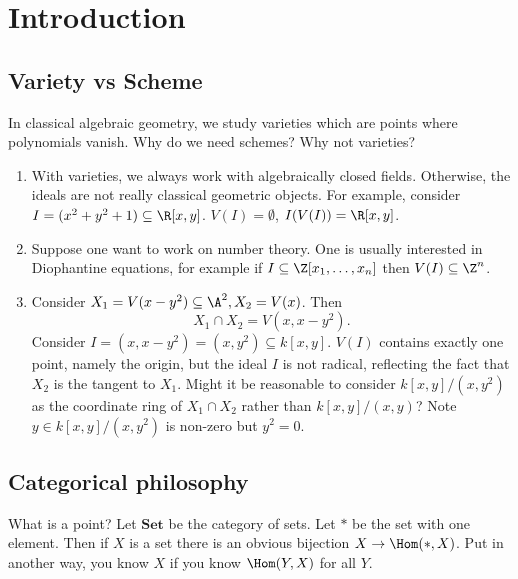 \documentclass[a4paper]{article}
\renewcommand{\c}[1]{\mathbf{#1}} %
\begin{document}


\tableofcontents

\setcounter{section}{-1}

\section{Introduction}

\subsection{Variety vs Scheme}

In classical algebraic geometry, we study varieties which are points where polynomials vanish. Why do we need schemes? Why not varieties?
\begin{enumerate}
\item With varieties, we always work with algebraically closed fields. Otherwise, the ideals are not really classical geometric objects. For example, consider \(I = (x^2 + y^2 + 1) \subseteq \R[x, y]\). \(V(I) = \emptyset\), \(I(V(I)) = \R[x, y]\).
\item Suppose one want to work on number theory. One is usually interested in Diophantine equations, for example if \(I \subseteq \Z[x_1, \dots, x_n]\) then \(V(I) \subseteq \Z^n\). 
\item Consider \(X_1 = V(x - y^2) \subseteq \A^2, X_2 = V(x)\). Then
  \[
    X_1 \cap X_2 = V(x, x - y^2).
  \]
  Consider \(I = (x, x - y^2) = (x, y^2) \subseteq k[x, y]\). \(V(I)\) contains exactly one point, namely the origin, but the ideal \(I\) is not radical, reflecting the fact that \(X_2\) is the tangent to \(X_1\). Might it be reasonable to consider \(k[x, y]/(x, y^2)\) as the coordinate ring of \(X_1 \cap X_2\) rather than \(k[x, y]/(x, y)\)? Note \(y \in k[x, y]/(x, y^2)\) is non-zero but \(y^2 = 0\).
\end{enumerate}

\subsection{Categorical philosophy}

What is a point? Let \(\c{Set}\) be the category of sets. Let \(*\) be the set with one element. Then if \(X\) is a set there is an obvious bijection \(X \to \Hom(*, X)\). Put in another way, you know \(X\) if you know \(\Hom(Y, X)\) for all \(Y\).
\end{document}
